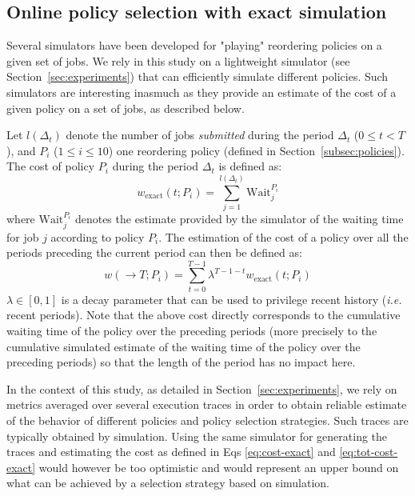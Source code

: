 \documentclass[sigconf]{acmart}
\begin{document}
\subsection{Online policy selection with exact simulation}
\label{sub:feedback}

Several simulators have been developed for "playing" reordering policies on a given set of jobs. We rely in this study on a lightweight simulator (see Section~\ref{sec:experiments}) that can efficiently simulate different policies. Such simulators are interesting inasmuch as they provide an estimate of the cost of a given policy on a set of jobs, as described below.

Let $l(\Delta_t)$ denote the number of jobs \textit{submitted} during the period $\Delta_t$ ($0 \le t < T$), and $P_i$ ($1 \le i \le 10$) one reordering policy (defined in Section~\ref{subsec:policies}). The cost of policy $P_i$ during the period $\Delta_t$ is defined as:
%
\begin{equation}
\label{eq:cost-exact}
w_{\mbox{exact}}(t;P_i) = \sum_{j=1}^{l(\Delta_t)} \mbox{Wait}_j^{P_i}
\end{equation}
%
where $\mbox{Wait}_j^{P_i}$ denotes the estimate provided by the simulator of the waiting time for job $j$ according to policy $P_i$. The estimation of the cost of a policy over all the periods preceding the current period can then be defined as:
%
\begin{equation}
\label{eq:tot-cost-exact}
w(\rightarrow T;P_i) = \sum_{t=0}^{T-1} \lambda^{T-1-t} w_{\mbox{exact}}(t;P_i)
\end{equation}
%
$\lambda \in [0,1]$ is a decay parameter that can be used to privilege recent history (\textit{i.e.} recent periods). Note that the above cost directly corresponds to the cumulative waiting time of the policy over the preceding periods (more precisely to the cumulative simulated estimate of the waiting time of the policy over the preceding periods) so that the length of the period has no impact here.

In the context of this study, as detailed in Section~\ref{sec:experiments}, we rely on metrics averaged over several execution traces in order to obtain reliable estimate of the behavior of different policies and policy selection strategies. Such traces are typically obtained by simulation. Using the same simulator for generating the traces and estimating the cost as defined in Eqs \ref{eq:cost-exact} and \ref{eq:tot-cost-exact} would however be too optimistic and would represent an upper bound on what can be achieved by a selection strategy based on simulation.
\end{document}
